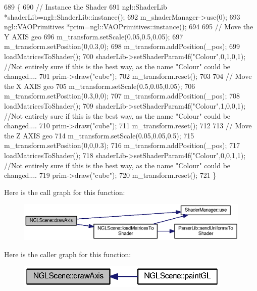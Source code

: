 \begin{DoxyCode}
689 \{
690   \textcolor{comment}{// Instance the Shader}
691   ngl::ShaderLib *shaderLib=ngl::ShaderLib::instance();
692   m_shaderManager->use(0);
693   ngl::VAOPrimitives *prim=ngl::VAOPrimitives::instance();
694 
695   \textcolor{comment}{// Move the Y AXIS geo}
696   m_transform.setScale(0.05,0.5,0.05);
697   m_transform.setPosition(0,0.3,0);
698   m_transform.addPosition(\_pos);
699   loadMatricesToShader();
700   shaderLib->setShaderParam4f(\textcolor{stringliteral}{"Colour"},0,1,0,1); \textcolor{comment}{//Not entirely sure if this is the best way, as the name
       "Colour" could be changed....}
701   prim->draw(\textcolor{stringliteral}{"cube"});
702   m_transform.reset();
703 
704   \textcolor{comment}{// Move the X AXIS geo}
705   m_transform.setScale(0.5,0.05,0.05);
706   m_transform.setPosition(0.3,0,0);
707   m_transform.addPosition(\_pos);
708   loadMatricesToShader();
709   shaderLib->setShaderParam4f(\textcolor{stringliteral}{"Colour"},1,0,0,1); \textcolor{comment}{//Not entirely sure if this is the best way, as the name
       "Colour" could be changed....}
710   prim->draw(\textcolor{stringliteral}{"cube"});
711   m_transform.reset();
712 
713   \textcolor{comment}{// Move the Z AXIS geo}
714   m_transform.setScale(0.05,0.05,0.5);
715   m_transform.setPosition(0,0,0.3);
716   m_transform.addPosition(\_pos);
717   loadMatricesToShader();
718   shaderLib->setShaderParam4f(\textcolor{stringliteral}{"Colour"},0,0,1,1); \textcolor{comment}{//Not entirely sure if this is the best way, as the name
       "Colour" could be changed....}
719   prim->draw(\textcolor{stringliteral}{"cube"});
720   m_transform.reset();
721 \}
\end{DoxyCode}


Here is the call graph for this function\-:\nopagebreak
\begin{figure}[H]
\begin{center}
\leavevmode
\includegraphics[width=350pt]{class_n_g_l_scene_a3fc824ff4a9140812b9ea473cdd9b2c5_cgraph}
\end{center}
\end{figure}




Here is the caller graph for this function\-:\nopagebreak
\begin{figure}[H]
\begin{center}
\leavevmode
\includegraphics[width=290pt]{class_n_g_l_scene_a3fc824ff4a9140812b9ea473cdd9b2c5_icgraph}
\end{center}
\end{figure}


